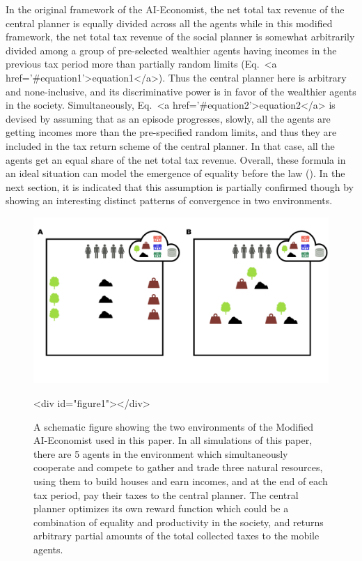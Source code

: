 \documentclass{article}
\begin{document}
In the original framework of the AI-Economist, the net total tax revenue of the central planner is equally divided across all the agents while in this modified framework, the net total tax revenue of the social planner is somewhat arbitrarily divided among a group of pre-selected wealthier agents \textendash having incomes in the previous tax period more than partially random limits (Eq.~<a href='#equation1'>equation1</a>). Thus the central planner here is arbitrary and none-inclusive, and its discriminative power is in favor of the wealthier agents in the society. Simultaneously, Eq.~<a href='#equation2'>equation2</a> is devised by assuming that as an episode progresses, slowly, all the agents are getting incomes more than the pre-specified random limits, and thus they are included in the tax return scheme of the central planner. In that case, all the agents get an equal share of the net total tax revenue. Overall, these formula \textendash in an ideal situation \textendash can model the emergence of equality before the law (\citep{Acemoglu2020}). In the next section, it is indicated that this assumption is partially confirmed though by showing an interesting distinct patterns of convergence in two environments.

\begin{figure}
\centering
\includegraphics[width=0.7\linewidth]{"A_Multi-agent_Reinforcement_Learning_Study_of_Emergence_of_Social_Classes_out_of_Arbitrary_Governance_The_Role_of_Environment_Slides_1/A_Multi-agent_Reinforcement_Learning_Study_of_Emergence_of_Social_Classes_out_of_Arbitrary_Governance_The_Role_of_Environment_Slides_1.001"}
\caption{A schematic figure showing the two environments of the Modified AI-Economist used in this paper. In all simulations of this paper, there are 5 agents in the environment which simultaneously cooperate and compete to gather and trade three natural resources, using them to build houses and earn incomes, and at the end of each tax period, pay their taxes to the central planner. The central planner optimizes its own reward function which could be a combination of equality and productivity in the society, and returns arbitrary partial amounts of the total collected taxes to the mobile agents.}
<div id="figure1"></div>

\end{figure}
\end{document}
